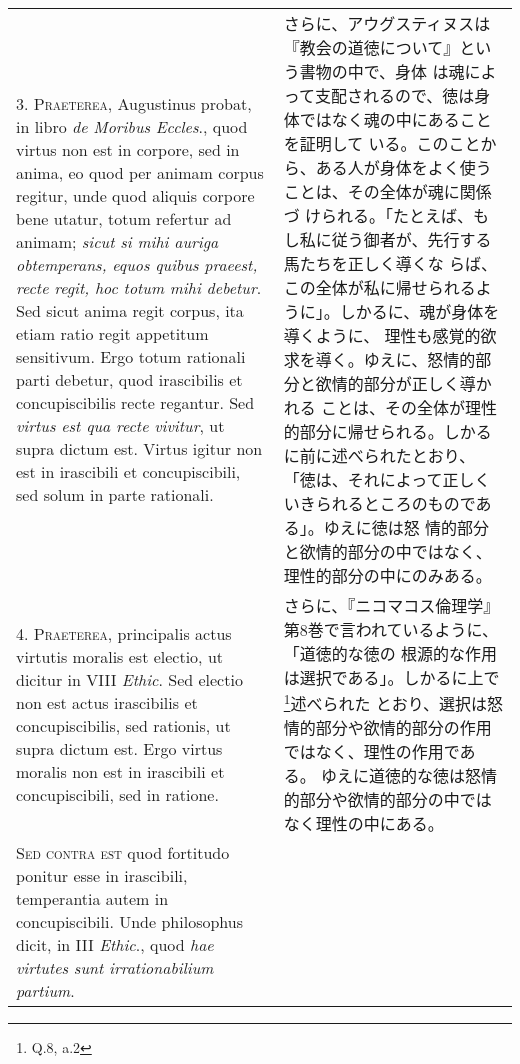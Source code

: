 \documentclass[10pt]{jsarticle}
\begin{document}
\begin{longtable}{p{21em}p{21em}}
\\

3. {\scshape Praeterea}, Augustinus probat, in libro {\itshape de
Moribus Eccles}., quod virtus non est in corpore, sed in anima, eo
quod per animam corpus regitur, unde quod aliquis corpore bene utatur,
totum refertur ad animam; {\itshape sicut si mihi auriga obtemperans,
equos quibus praeest, recte regit, hoc totum mihi debetur}. Sed sicut
anima regit corpus, ita etiam ratio regit appetitum sensitivum. Ergo
totum rationali parti debetur, quod irascibilis et concupiscibilis
recte regantur. Sed {\itshape virtus est qua recte vivitur}, ut supra
dictum est. Virtus igitur non est in irascibili et concupiscibili, sed
solum in parte rationali.

&

さらに、アウグスティヌスは『教会の道徳について』という書物の中で、身体
は魂によって支配されるので、徳は身体ではなく魂の中にあることを証明して
いる。このことから、ある人が身体をよく使うことは、その全体が魂に関係づ
けられる。「たとえば、もし私に従う御者が、先行する馬たちを正しく導くな
らば、この全体が私に帰せられるように」。しかるに、魂が身体を導くように、
理性も感覚的欲求を導く。ゆえに、怒情的部分と欲情的部分が正しく導かれる
ことは、その全体が理性的部分に帰せられる。しかるに前に述べられたとおり、
「徳は、それによって正しくいきられるところのものである」。ゆえに徳は怒
情的部分と欲情的部分の中ではなく、理性的部分の中にのみある。

\\

4. {\scshape Praeterea}, principalis actus virtutis moralis est
electio, ut dicitur in VIII {\itshape Ethic}. Sed electio non est
actus irascibilis et concupiscibilis, sed rationis, ut supra dictum
est. Ergo virtus moralis non est in irascibili et concupiscibili, sed
in ratione.

&

さらに、『ニコマコス倫理学』第8巻で言われているように、「道徳的な徳の
根源的な作用は選択である」。しかるに上で\footnote{Q.8, a.2}述べられた
とおり、選択は怒情的部分や欲情的部分の作用ではなく、理性の作用である。
ゆえに道徳的な徳は怒情的部分や欲情的部分の中ではなく理性の中にある。

\\

{\scshape Sed contra est} quod fortitudo ponitur esse in irascibili,
temperantia autem in concupiscibili. Unde philosophus dicit, in III
{\itshape Ethic}., quod {\itshape hae virtutes sunt irrationabilium
partium}.

&


\end{longtable}
\end{document}

